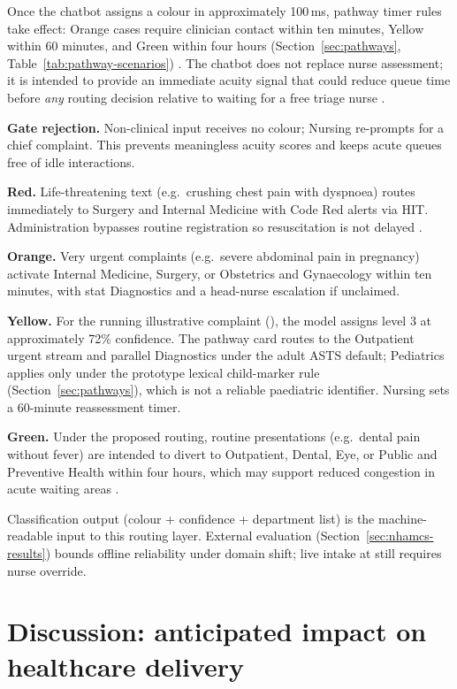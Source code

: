 Once the chatbot assigns a colour in approximately 100\,ms, pathway timer rules take effect: Orange cases require clinician contact within ten minutes, Yellow within 60 minutes, and Green within four hours (Section~\ref{sec:pathways}, Table~\ref{tab:pathway-scenarios}) \citep{satsmanual,Sundstrom2014}. The chatbot does not replace nurse assessment; it is intended to provide an immediate acuity signal that could reduce queue time before \emph{any} routing decision relative to waiting for a free triage nurse \citep{Mitchell2023,Nurchis2025}.

\textbf{Gate rejection.} Non-clinical input receives no colour; Nursing re-prompts for a chief complaint. This prevents meaningless acuity scores and keeps acute queues free of idle interactions.

\textbf{Red.} Life-threatening text (e.g.\ crushing chest pain with dyspnoea) routes immediately to Surgery and Internal Medicine with Code Red alerts via HIT. Administration bypasses routine registration so resuscitation is not delayed \citep{satsmanual}.

\textbf{Orange.} Very urgent complaints (e.g.\ severe abdominal pain in pregnancy) activate Internal Medicine, Surgery, or Obstetrics and Gynaecology within ten minutes, with stat Diagnostics and a head-nurse escalation if unclaimed.

\textbf{Yellow.} For the running illustrative complaint (\runningcomplaint{}), the model assigns level 3 at approximately 72\% confidence. The pathway card routes to the Outpatient urgent stream and parallel Diagnostics under the adult ASTS default; Pediatrics applies only under the prototype lexical child-marker rule (Section~\ref{sec:pathways}), which is not a reliable paediatric identifier. Nursing sets a 60-minute reassessment timer.

\textbf{Green.} Under the proposed routing, routine presentations (e.g.\ dental pain without fever) are intended to divert to Outpatient, Dental, Eye, or Public and Preventive Health within four hours, which may support reduced congestion in acute waiting areas \citep{Yilmaz2021,Sundstrom2014}.

Classification output (colour + confidence + department list) is the machine-readable input to this routing layer. External evaluation (Section~\ref{sec:nhamcs-results}) bounds offline reliability under domain shift; live intake at \examplehospital{} still requires nurse override.

\section{Discussion: anticipated impact on healthcare delivery}
\label{sec:impact}

